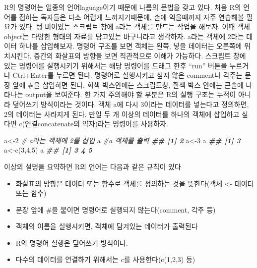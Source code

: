 \documentclass[
]{book}
\newenvironment{Shaded}{\begin{snugshade}}{\end{snugshade}}
\newcommand{\CommentTok}[1]{\textcolor[rgb]{0.56,0.35,0.01}{\textit{#1}}}
\newcommand{\DecValTok}[1]{\textcolor[rgb]{0.00,0.00,0.81}{#1}}
\newcommand{\DocumentationTok}[1]{\textcolor[rgb]{0.56,0.35,0.01}{\textbf{\textit{#1}}}}
\newcommand{\FunctionTok}[1]{\textcolor[rgb]{0.00,0.00,0.00}{#1}}
\newcommand{\NormalTok}[1]{#1}
\newcommand{\OtherTok}[1]{\textcolor[rgb]{0.56,0.35,0.01}{#1}}
\providecommand{\tightlist}{%
  \setlength{\itemsep}{0pt}\setlength{\parskip}{0pt}}
\theoremstyle{definition}
\theoremstyle{definition}
\theoremstyle{definition}
\theoremstyle{definition}
\theoremstyle{remark}
\begin{document}
R의 명령어는 일종의 언어laguage이기 때문에 나름의 문법을 갖고 있다. 처음 R의 언어를 접하는 독자들은 다소 어렵게 느껴지기때문에, 손에 익을때까지 자주 연습해볼 필요가 있다. 텅 비어있는 스크립트 창에 a라는 객체를 만드는 작업을 해보자. 이때 객체object는 다양한 형태의 자료를 담고있는 바구니라고 생각하자. a라는 객체에 2라는 데이터 하나를 삽입해보자. 명령어 구조를 보면 객체는 왼쪽, 넣을 데이터는 오른쪽에 위치시킨다. 중간의 화살표의 방향을 보면 직관적으로 이해가 가능하다. 스크립트 창에 있는 명령어를 실행시키기 위해서는 해당 명령어를 드래그 한후 ``run'' 버튼을 누르거나 Ctrl+Enter를 누르면 된다. 명령어로 실행시키고 싶지 않은 comment나 각주는 문장 앞에 \#을 삽입하면 된다. 회색 박스안에는 스크립트창, 흰색 박스 안에는 콘솔에 나타나는 output을 보여준다. 한 가지 주의해야 할 부분은 R의 실행 구조는 누적이 아니라 덮어쓰기 방식이라는 것이다. 객체 a에 다시 3이라는 데이터를 넣는다고 정의하면, 2의 데이터는 사라지게 된다. 만일 두 개 이상의 데이터를 하나의 객체에 삽입하고 싶다면 c(연결concatenate의 약자)라는 명령어를 사용하자.

\begin{Shaded}
\begin{Highlighting}[]
\NormalTok{a}\OtherTok{\textless{}{-}}\DecValTok{2} \CommentTok{\# a라는 객체에 2를 삽입}
\NormalTok{a }\CommentTok{\#a 객체를 출력}
\DocumentationTok{\#\# [1] 2}
\NormalTok{a}\OtherTok{\textless{}{-}}\DecValTok{3} 
\NormalTok{a}
\DocumentationTok{\#\# [1] 3}
\NormalTok{a}\OtherTok{\textless{}{-}}\FunctionTok{c}\NormalTok{(}\DecValTok{3}\NormalTok{,}\DecValTok{4}\NormalTok{,}\DecValTok{5}\NormalTok{)}
\NormalTok{a}
\DocumentationTok{\#\# [1] 3 4 5}
\end{Highlighting}
\end{Shaded}

이상의 설명을 요약하면 R의 언어는 다음과 같은 규칙이 있다

\begin{itemize}
\tightlist
\item
  화살표의 방향은 데이터 또는 함수로 객체를 정의하는 것을 뜻한다(객체 \textless- 데이터 또는 함수)
\item
  문장 앞에 \#을 붙이면 명령어로 실행되지 않는다(comment, 각주 등)
\item
  객체의 이름을 실행시키면, 객체에 담겨있는 데이터가 출력된다
\item
  R의 명령어 실행은 덮어쓰기 방식이다.
\item
  다수의 데이터를 연결하기 위해서는 c를 사용한다(c(1,2,3) 등)
\end{itemize}
\end{document}
